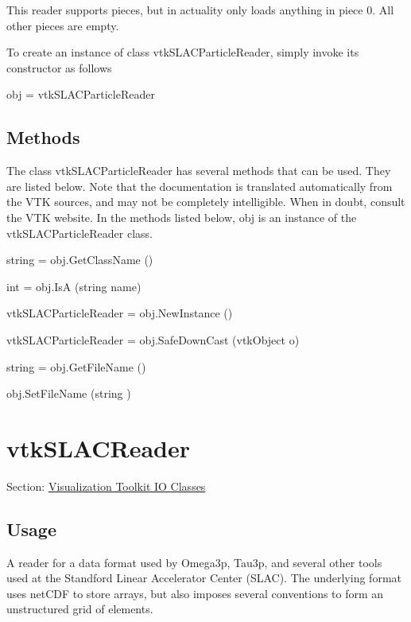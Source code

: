This reader supports pieces, but in actuality only loads anything in piece 0. All other pieces are empty.

To create an instance of class vtk\-S\-L\-A\-C\-Particle\-Reader, simply invoke its constructor as follows \begin{DoxyVerb}  obj = vtkSLACParticleReader
\end{DoxyVerb}
 \hypertarget{vtkwidgets_vtkxyplotwidget_Methods}{}\subsection{Methods}\label{vtkwidgets_vtkxyplotwidget_Methods}
The class vtk\-S\-L\-A\-C\-Particle\-Reader has several methods that can be used. They are listed below. Note that the documentation is translated automatically from the V\-T\-K sources, and may not be completely intelligible. When in doubt, consult the V\-T\-K website. In the methods listed below, {\ttfamily obj} is an instance of the vtk\-S\-L\-A\-C\-Particle\-Reader class. 
\begin{DoxyItemize}
\item {\ttfamily string = obj.\-Get\-Class\-Name ()}  
\item {\ttfamily int = obj.\-Is\-A (string name)}  
\item {\ttfamily vtk\-S\-L\-A\-C\-Particle\-Reader = obj.\-New\-Instance ()}  
\item {\ttfamily vtk\-S\-L\-A\-C\-Particle\-Reader = obj.\-Safe\-Down\-Cast (vtk\-Object o)}  
\item {\ttfamily string = obj.\-Get\-File\-Name ()}  
\item {\ttfamily obj.\-Set\-File\-Name (string )}  
\end{DoxyItemize}\hypertarget{vtkio_vtkslacreader}{}\section{vtk\-S\-L\-A\-C\-Reader}\label{vtkio_vtkslacreader}
Section\-: \hyperlink{sec_vtkio}{Visualization Toolkit I\-O Classes} \hypertarget{vtkwidgets_vtkxyplotwidget_Usage}{}\subsection{Usage}\label{vtkwidgets_vtkxyplotwidget_Usage}
A reader for a data format used by Omega3p, Tau3p, and several other tools used at the Standford Linear Accelerator Center (S\-L\-A\-C). The underlying format uses net\-C\-D\-F to store arrays, but also imposes several conventions to form an unstructured grid of elements.

